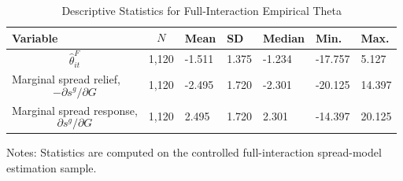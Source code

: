 \begin{table}[H]\centering
\begin{threeparttable}
\caption{Descriptive Statistics for Full-Interaction Empirical Theta}
\label{tab:theta_descriptive_stats}
\scriptsize
\begin{tabularx}{\textwidth}{lYYYYYY}
\toprule
Variable & $$N$$ & Mean & SD & Median & Min. & Max. \\
\midrule
$$\widehat{\theta}^{F}_{it}$$ & 1,120 & -1.511 & 1.375 & -1.234 & -17.757 & 5.127 \\
Marginal spread relief, $$-\partial s^g/\partial G$$ & 1,120 & -2.495 & 1.720 & -2.301 & -20.125 & 14.397 \\
Marginal spread response, $$\partial s^g/\partial G$$ & 1,120 & 2.495 & 1.720 & 2.301 & -14.397 & 20.125 \\
\bottomrule
\end{tabularx}
\begin{tablenotes}[flushleft]\footnotesize
\item Notes: Statistics are computed on the controlled full-interaction spread-model estimation sample.
\end{tablenotes}
\end{threeparttable}
\end{table}
